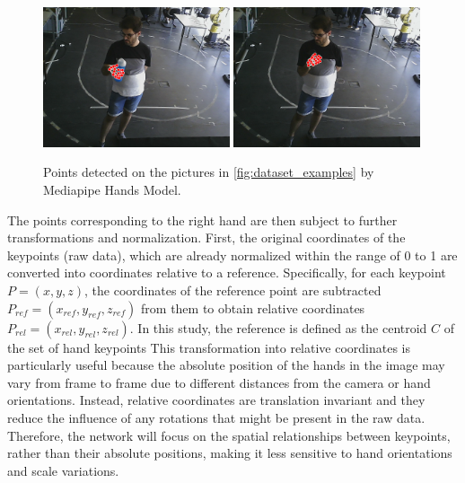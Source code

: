 \begin{figure}[ht]
    \centerline{\includegraphics[width=0.49\textwidth]{figs/dataset_preprocessing2_1.png} \includegraphics[width=0.49\textwidth]{figs/dataset_preprocessing2_2.png}}
    \caption{Points detected on the pictures in \autoref{fig:dataset_examples} by Mediapipe Hands Model.}
    \label{fig:dataset_examples2}
\end{figure}

The points corresponding to the right hand are then subject to further transformations and normalization. First, the original coordinates of the keypoints (raw data), which are already normalized within the range of 0 to 1 are converted into coordinates relative to a reference. Specifically, for each keypoint $P = (x,y,z)$, the coordinates of the reference point are subtracted $P_{ref} = (x_{ref}, y_{ref}, z_{ref})$ from them to obtain relative coordinates $P_{rel} = (x_{rel}, y_{rel}, z_{rel})$. In this study, the reference is defined as the centroid $C$ of the set of hand keypoints %
This transformation into relative coordinates is particularly useful because the absolute position of the hands in the image may vary from frame to frame due to different distances from the camera or hand orientations. Instead, relative coordinates are translation invariant and they reduce the influence of any rotations that might be present in the raw data. Therefore, the network will focus on the spatial relationships between keypoints, rather than their absolute positions, making it less sensitive to hand orientations and scale variations.

